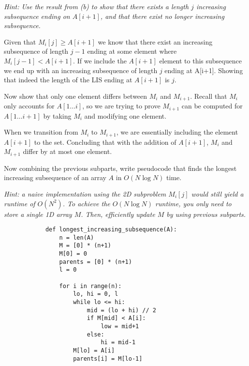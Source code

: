 \documentclass[11pt]{article}
\begin{document}
\begin{subparts}
    \emph{Hint: Use the result from (b) to show that there exists a length $j$ increasing subsequence ending on $A[i+1]$, and that there exist no longer increasing subsequence.}\\
    \begin{solution}
        Given that $M_i[j] \geq A[i + 1]$ we know that there exist an increasing subsequence of length $j-1$ ending at some element
        where $M_i[j-1] < A[i+1]$. If we include the $A[i+1]$ element to this subsequence we end up with an increasing 
        subsequence of length $j$ ending at A[i+1]. Showing that indeed the length of the LIS ending at $A[i+1]$ is $j$.
    \end{solution}
    \subpart Now show that only one element differs between $M_i$ and $M_{i+1}$. Recall that $M_i$ only accounts for $A[1 \dots i]$, so we are trying to prove $M_{i+1}$ can be computed for $A[1 \dots i+1]$ by taking $M_i$ and modifying one element.\\
    \begin{solution}
        When we transition from $M_i$  to $M_{i+1}$, we are essentially including the element $A[i+1]$ to the set.
        Concluding that with the addition of $A[i+1]$, $M_i$ and $M_{i+1}$ differ by at most one element.
    \end{solution}
    \newpage
    \subpart Now combining the previous subparts, write pseudocode that finds the longest increasing subsequence of an array $A$ in $O(N \log N)$ time. 
    
    \emph{Hint: a naive implementation using the 2D subproblem $M_i[j]$ would still yield a runtime of $O(N^2)$. To achieve the $O(N \log N)$ runtime, you only need to store a single 1D array $M$. Then, efficiently update $M$ by using previous subparts.}\\
    \begin{solution}
        \begin{verbatim}
            def longest_increasing_subsequence(A):
                n = len(A)
                M = [0] * (n+1)
                M[0] = 0
                parents = [0] * (n+1)
                l = 0

                for i in range(n):
                    lo, hi = 0, l
                    while lo <= hi:
                        mid = (lo + hi) // 2
                        if M[mid] < A[i]:
                            low = mid+1
                        else:
                            hi = mid-1
                    M[lo] = A[i]
                    parents[i] = M[lo-1]


\end{verbatim}
\end{solution}
\end{subparts}
\end{document}
